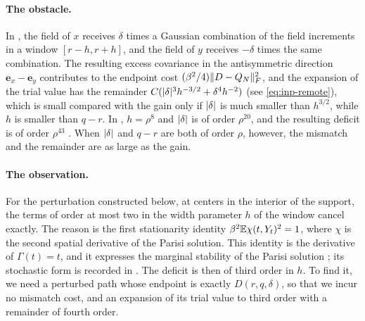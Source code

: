 \paragraph{The obstacle.} In \cite[Section~7]{oai-barriers}, the field of $x$
receives $\delta$ times a Gaussian combination of the field increments in a
window $[r-h,r+h]$, and the field of $y$ receives $-\delta$ times the same
combination. The resulting excess covariance in the antisymmetric direction
$\mathbf e_x-\mathbf e_y$ contributes to the endpoint cost $(\beta^2/4)\lVert D-Q_N\rVert_F^2$, and the expansion of
the trial value has the remainder $C(\lvert \delta\rvert^3h^{-3/2}+\delta^4h^{-2})$
(see \eqref{eq:inp-remote}), which is small compared with the gain only if
$\lvert \delta\rvert$ is much smaller than $h^{3/2}$, while $h$ is smaller than $q-r$.
In \cite{oai-barriers}, $h=\rho^8$ and $\lvert \delta\rvert$ is of order $\rho^{20}$,
and the resulting deficit is of order $\rho^{43}$ \cite[(7.32)]{oai-barriers}.
When $\lvert \delta\rvert$ and $q-r$ are both of order $\rho$, however, the mismatch and
the remainder are as large as the gain.

\paragraph{The observation.} For the perturbation constructed below, at
centers in the interior of the support, the terms of order at most two in the
width parameter $h$ of the window cancel exactly. The reason is the first stationarity identity
$\beta^2\mathbb E\chi(t,Y_t)^2=1$, where $\chi$ is the second spatial derivative of
the Parisi solution. This identity is the derivative of $\Gamma(t)=t$, and it
expresses the marginal stability of the Parisi solution
\cite[(22)--(23)]{crisanti-rizzo-2002}; its stochastic form is recorded in
\cite[Lemma~2.5]{full-rsb}. The deficit is then of
third order in $h$. To find it, we need a perturbed path whose endpoint
is exactly $D(r,q,\delta)$, so that we incur no mismatch cost, and an expansion of
its trial value to third order with a remainder of fourth order.


